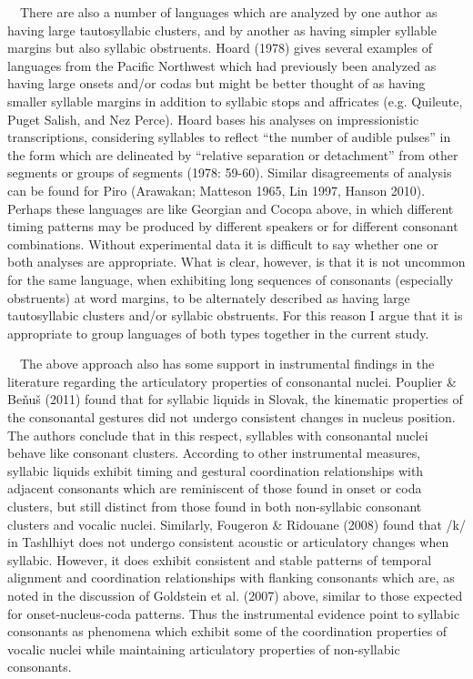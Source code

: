 \documentclass[12pt]{article}
\newenvironment{styleBody}{\renewcommand\baselinestretch{1.0}\setlength\leftskip{0in}\setlength\rightskip{0in plus 1fil}\setlength\parindent{0in}\setlength\parfillskip{0pt plus 1fil}\setlength\parskip{0in plus 1pt}\writerlistparindent\writerlistleftskip\leavevmode\normalfont\normalsize\fontsize{11pt}{13.2pt}\selectfont\mdseries\upshape\writerlistlabel\ignorespaces}{\unskip\vspace{0in plus 1pt}\par}
\newcommand\writerlistleftskip{}
\newcommand\writerlistparindent{}
\newcommand\writerlistlabel{}
\begin{document}
\begin{styleBody}
\ \ There are also a number of languages which are analyzed by one author as having large tautosyllabic clusters, and by another as having simpler syllable margins but also syllabic obstruents. Hoard (1978) gives several examples of languages from the Pacific Northwest which had previously been analyzed as having large onsets and/or codas but might be better thought of as having smaller syllable margins in addition to syllabic stops and affricates (e.g. Quileute, Puget Salish, and Nez Perce). Hoard bases his analyses on impressionistic transcriptions, considering syllables to reflect “the number of audible pulses” in the form which are delineated by “relative separation or detachment” from other segments or groups of segments (1978: 59-60). Similar disagreements of analysis can be found for Piro (Arawakan; Matteson 1965, Lin 1997, Hanson 2010). Perhaps these languages are like Georgian and Cocopa above, in which different timing patterns may be produced by different speakers or for different consonant combinations. Without experimental data it is difficult to say whether one or both analyses are appropriate. What is clear, however, is that it is not uncommon for the same language, when exhibiting long sequences of consonants (especially obstruents) at word margins, to be alternately described as having large tautosyllabic clusters and/or syllabic obstruents. For this reason I argue that it is appropriate to group languages of both types together in the current study.
\end{styleBody}

\begin{styleBody}
\ \ The above approach also has some support in instrumental findings in the literature regarding the articulatory properties of consonantal nuclei. Pouplier \& Beňuš (2011) found that for syllabic liquids in Slovak, the kinematic properties of the consonantal gestures did not undergo consistent changes in nucleus position. The authors conclude that in this respect, syllables with consonantal nuclei behave like consonant clusters. According to other instrumental measures, syllabic liquids exhibit timing and gestural coordination relationships with adjacent consonants which are reminiscent of those found in onset or coda clusters, but still distinct from those found in both non-syllabic consonant clusters and vocalic nuclei. Similarly, Fougeron \& Ridouane (2008) found that /k/ in Tashlhiyt does not undergo consistent acoustic or articulatory changes when syllabic. However, it does exhibit consistent and stable patterns of temporal alignment and coordination relationships with flanking consonants which are, as noted in the discussion of Goldstein et al. (2007) above, similar to those expected for onset-nucleus-coda patterns. Thus the instrumental evidence point to syllabic consonants as phenomena which exhibit some of the coordination properties of vocalic nuclei while maintaining articulatory properties of non-syllabic consonants.
\end{styleBody}
\end{document}
